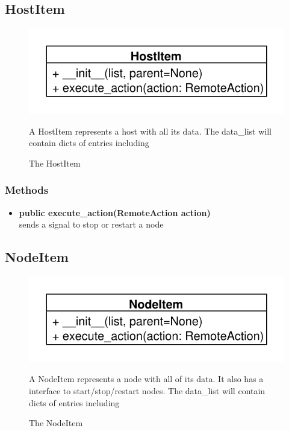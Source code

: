 \newpage
\subsection{HostItem}
\begin{figure}[htbp]
	\begin{minipage}[t]{7cm}
		\vspace{0pt}
		\centering
		\includegraphics[scale=0.6]{./diagram_pictures/HostItem.pdf}
		\caption{The HostItem}
	\end{minipage}
	\hfill
	\begin{minipage}[t]{8cm}
		\vspace{10pt}		
		A HostItem represents a host with all its data.
		The data\_list will contain dicts of entries including 
	\end{minipage}
\end{figure}
\subsubsection{Methods}
\begin{itemize}
  \item \textbf{public execute\_action(RemoteAction action)}\\
  sends a signal to stop or restart a node
\end{itemize}

\subsection{NodeItem}
\begin{figure}[htbp]
	\begin{minipage}[t]{7cm}
		\vspace{0pt}
		\centering
		\includegraphics[scale=0.6]{./diagram_pictures/NodeItem.pdf}
		\caption{The NodeItem}
	\end{minipage}
	\hfill
	\begin{minipage}[t]{8cm}
		\vspace{10pt}		
		A NodeItem represents a node with all of its data. It also has a interface to
		start/stop/restart nodes. The data\_list will contain dicts of entries including 
	\end{minipage}
\end{figure} 
